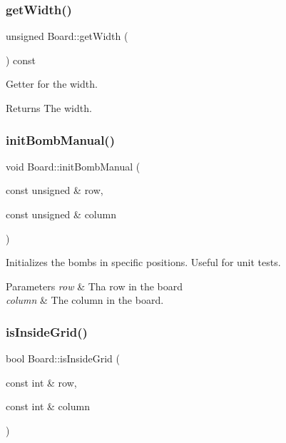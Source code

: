 \subsubsection{\texorpdfstring{get\+Width()}{getWidth()}}
{\footnotesize\ttfamily unsigned Board\+::get\+Width (\begin{DoxyParamCaption}{ }\end{DoxyParamCaption}) const\hspace{0.3cm}{\ttfamily [inline]}}



Getter for the width. 

\begin{DoxyReturn}{Returns}
The width. 
\end{DoxyReturn}
\mbox{\label{class_board_a4e4962f91b8258edc7be50714a3c5668}} 
\subsubsection{\texorpdfstring{init\+Bomb\+Manual()}{initBombManual()}}
{\footnotesize\ttfamily void Board\+::init\+Bomb\+Manual (\begin{DoxyParamCaption}\item[{const unsigned \&}]{row,  }\item[{const unsigned \&}]{column }\end{DoxyParamCaption})}



Initializes the bombs in specific positions. Useful for unit tests. 


\begin{DoxyParams}{Parameters}
{\em row} & Tha row in the board \\
\hline
{\em column} & The column in the board. \\
\hline
\end{DoxyParams}
\mbox{\label{class_board_acfe30fe7eede25b2fec132e7f89cb270}} 
\subsubsection{\texorpdfstring{is\+Inside\+Grid()}{isInsideGrid()}}
{\footnotesize\ttfamily bool Board\+::is\+Inside\+Grid (\begin{DoxyParamCaption}\item[{const int \&}]{row,  }\item[{const int \&}]{column }\end{DoxyParamCaption})}



